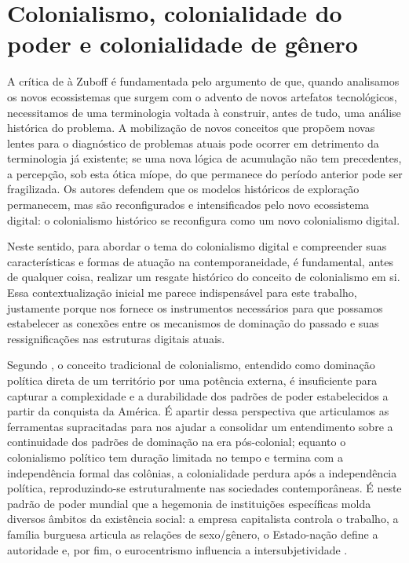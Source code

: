 \section{Colonialismo, colonialidade do poder e colonialidade de gênero}
\label{sec:colonialismo-colonialidade-genero}

A crítica de  à Zuboff é fundamentada pelo argumento de que, quando analisamos os novos ecossistemas que surgem com o advento de novos artefatos tecnológicos, necessitamos de uma terminologia voltada à construir, antes de tudo, uma análise histórica do problema. A mobilização de novos conceitos que propõem novas lentes para o diagnóstico de problemas atuais pode ocorrer em detrimento da terminologia já existente; se uma nova lógica de acumulação não tem precedentes, a percepção, sob esta ótica míope, do que permanece do período anterior pode ser fragilizada. Os autores defendem que os modelos históricos de exploração permanecem, mas são reconfigurados e intensificados pelo novo ecossistema digital: o colonialismo histórico se reconfigura como um novo colonialismo digital.

Neste sentido, para abordar o tema do colonialismo digital e compreender suas características e formas de atuação na contemporaneidade, é fundamental, antes de qualquer coisa, realizar um resgate histórico do conceito de colonialismo em si. Essa contextualização inicial me parece indispensável para este trabalho, justamente porque nos fornece os instrumentos necessários para que possamos estabelecer as conexões entre os mecanismos de dominação do passado e suas ressignificações nas estruturas digitais atuais.

Segundo , o conceito tradicional de colonialismo, entendido como dominação política direta de um território por uma potência externa, é insuficiente para capturar a complexidade e a durabilidade dos padrões de poder estabelecidos a partir da conquista da América. É apartir dessa perspectiva que articulamos as ferramentas supracitadas para nos ajudar a consolidar um entendimento sobre a continuidade dos padrões de dominação na era pós-colonial; equanto o colonialismo político tem duração limitada no tempo e termina com a independência formal das colônias, a colonialidade perdura após a independência política, reproduzindo-se estruturalmente nas sociedades contemporâneas. É neste padrão de poder mundial que a hegemonia de instituições específicas molda diversos âmbitos da existência social: a empresa capitalista controla o trabalho, a família burguesa articula as relações de sexo/gênero, o Estado-nação define a autoridade e, por fim, o eurocentrismo influencia a intersubjetividade \cite{quijano2005}.

